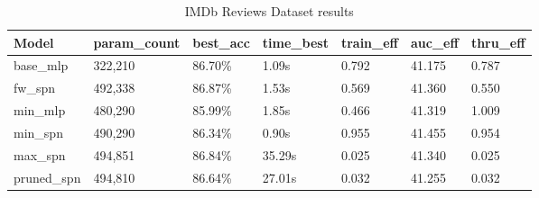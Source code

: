 \begin{table}[h!]
    \centering
    \caption{IMDb Reviews Dataset results}
    \begin{tabular}{|l|l|l|l|l|l|l|}
    \hline
    \textbf{Model} & \textbf{param\_count} & \textbf{best\_acc} & \textbf{time\_best} & \textbf{train\_eff} & \textbf{auc\_eff} & \textbf{thru\_eff} \\
    \hline
    base\_mlp & 322,210 & 86.70\% & 1.09s & 0.792 & \cellcolor{red!25}41.175 & 0.787 \\
    fw\_spn & 492,338 & \cellcolor{green!25}86.87\% & 1.53s & 0.569 & 41.360 & 0.550 \\
    min\_mlp & 480,290 & \cellcolor{red!25}85.99\% & 1.85s & 0.466 & 41.319 & \cellcolor{green!25}1.009 \\
    min\_spn & 490,290 & 86.34\% & \cellcolor{green!25}0.90s & \cellcolor{green!25}0.955 & \cellcolor{green!25}41.455 & 0.954 \\
    max\_spn & 494,851 & 86.84\% & \cellcolor{red!25}35.29s & \cellcolor{red!25}0.025 & 41.340 & \cellcolor{red!25}0.025 \\
    pruned\_spn & 494,810 & 86.64\% & 27.01s & 0.032 & 41.255 & 0.032 \\
    \hline
    \end{tabular}
    \label{tab:imdbResults}
\end{table}

